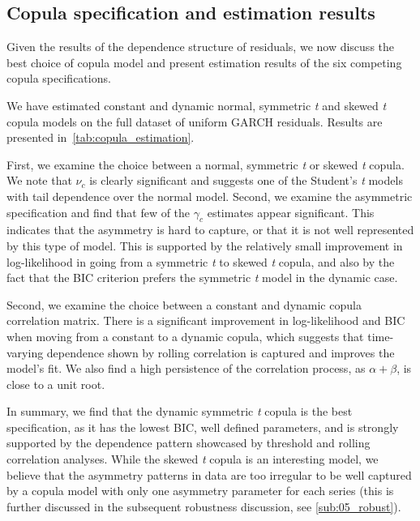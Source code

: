 \subsection{Copula specification and estimation results}
Given the results of the dependence structure of residuals, we now discuss the best choice of copula model and present estimation results of the six competing copula specifications.

We have estimated constant and dynamic normal, symmetric \emph{t} and skewed \emph{t} copula models on the full dataset of uniform GARCH residuals. Results are presented in~\autoref{tab:copula_estimation}. 

First, we examine the choice between a normal, symmetric \emph{t} or skewed \emph{t} copula. We note that $\nu_c$ is clearly significant and suggests one of the Student's \emph{t} models with tail dependence over the normal model. Second, we examine the asymmetric specification and find that few of the $\gamma_c$ estimates appear significant. This indicates that the asymmetry is hard to capture, or that it is not well represented by this type of model. This is supported by the relatively small improvement in log-likelihood in going from a symmetric \emph{t} to skewed \emph{t} copula, and also by the fact that the BIC criterion prefers the symmetric \emph{t} model in the dynamic case. 

Second, we examine the choice between a constant and dynamic copula correlation matrix. There is a significant improvement in log-likelihood and BIC when moving from a constant to a dynamic copula, which suggests that time-varying dependence shown by rolling correlation is captured and improves the model's fit. We also find a high persistence of the correlation process, as $\alpha + \beta$, is close to a unit root.

In summary, we find that the dynamic symmetric \emph{t} copula is the best specification, as it has the lowest BIC, well defined parameters, and is strongly supported by the dependence pattern showcased by threshold and rolling correlation analyses. While the skewed \emph{t} copula is an interesting model, we believe that the asymmetry patterns in data are too irregular to be well captured by a copula model with only one asymmetry parameter for each series (this is further discussed in the subsequent robustness discussion, see \autoref{sub:05_robust}).

